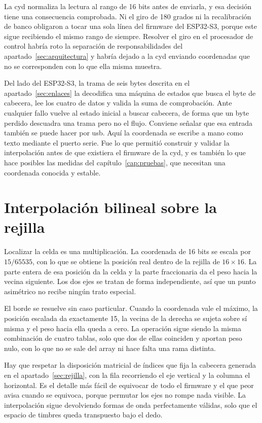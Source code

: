 La \gls{cyd} normaliza la lectura al rango de 16 bits antes de enviarla, y esa
decisión tiene una consecuencia comprobada. Ni el giro de 180 grados ni la
recalibración de banco obligaron a tocar una sola línea del firmware del
ESP32-S3, porque este sigue recibiendo el mismo rango de siempre. Resolver el
giro en el procesador de control habría roto la separación de responsabilidades
del apartado~\ref{sec:arquitectura} y habría dejado a la \gls{cyd} enviando
coordenadas que no se corresponden con lo que ella misma muestra.

Del lado del ESP32-S3, la trama de seis bytes descrita en el
apartado~\ref{sec:enlaces} la decodifica una máquina de estados que busca el byte
de cabecera, lee los cuatro de datos y valida la suma de comprobación. Ante
cualquier fallo vuelve al estado inicial a buscar cabecera, de forma que un byte
perdido descuadra una trama pero no el flujo. Conviene señalar que esa entrada
también se puede hacer por \gls{usb}. Aquí la coordenada se escribe a mano como
texto mediante el puerto serie. Fue lo que permitió construir y
validar la interpolación antes de que existiera el firmware de la \gls{cyd}, y
es también lo que hace posibles las medidas del capítulo~\ref{cap:pruebas}, que
necesitan una coordenada conocida y estable.

\section{Interpolación bilineal sobre la rejilla}
\label{sec:bilineal}

Localizar la celda es una multiplicación. La coordenada de 16 bits se escala por
$15/65535$, con lo que se obtiene la posición real dentro de la rejilla de
$16\times16$. La parte entera de esa posición da la celda y la parte fraccionaria
da el peso hacia la vecina siguiente. Los dos ejes se tratan de forma
independiente, así que un punto asimétrico no recibe ningún trato especial.

El borde se resuelve sin caso particular. Cuando la coordenada vale el máximo, la
posición escalada da exactamente 15, la vecina de la derecha se sujeta sobre sí
misma y el peso hacia ella queda a cero. La operación sigue siendo la misma
combinación de cuatro tablas, solo que dos de ellas coinciden y aportan peso
nulo, con lo que no se sale del array ni hace falta una rama distinta.

Hay que respetar la disposición matricial de índices que fija la cabecera generada en el
apartado~\ref{sec:rejilla}, con la fila recorriendo el eje vertical y la columna
el horizontal. Es el detalle más fácil de equivocar de todo el firmware y el que
peor avisa cuando se equivoca, porque permutar los ejes no rompe nada visible.
La interpolación sigue devolviendo formas de onda perfectamente válidas, solo que
el espacio de timbres queda transpuesto bajo el dedo.

